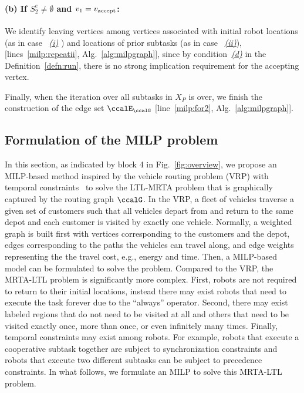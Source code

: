\documentclass[Afour,sageh,times]{sagej}
\newcommand{\vertex}[1]{v_{\textup{#1}}}
\begin{document}
\paragraph{(b) If $S_2^e \neq \emptyset$ and $v_1 = \vertex{accept}$:}\label{edge:vertex3} We identify leaving vertices among vertices associated with initial robot locations (as in case ~\hyperref[sec:a]{\it (i)} ) and locations of prior subtasks (as in case ~\hyperref[sec:a]{\it (ii)}), [lines~\ref{milp:repeatii},  Alg.~\ref{alg:milpgraph}], since by condition~\hyperref[cond:d]{\it (d)} in the Definition~\ref{defn:run}, there is no strong implication requirement for the accepting vertex.



Finally,  when the iteration over all subtasks in $X_{P}$ is over, we finish the construction of  the edge set $\ccalE_\ccalG$ [line~\ref{milp:for2},  Alg.~\ref{alg:milpgraph}].


 \subsection{Formulation of the MILP problem}\label{sec:milp}
 In this section, as indicated by block 4 in Fig.~\ref{fig:overview}, we propose an MILP-based method inspired by the vehicle routing problem (VRP) with temporal constraints~\cite{bredstrom2008combined} to solve the LTL-MRTA problem that is graphically captured by the routing graph $\ccalG$. In the VRP, a fleet of vehicles traverse a given set of customers such that all vehicles depart from and return to the same depot and each customer is visited by exactly one vehicle. Normally, a weighted graph is built first with vertices corresponding to the customers and the depot, edges corresponding to the paths the vehicles can travel along, and edge weights representing the the travel cost, e.g., energy and time. Then,  a MILP-based model can be formulated to solve the problem. Compared to the VRP, the MRTA-LTL problem is significantly more complex. First, robots are not required  to return to their initial locations, instead there may exist robots that need to execute the task forever due to the  ``always'' operator. Second, there may exist  labeled regions that do not need to be  visited at all and others that need to be visited exactly once,  more than once, or even infinitely  many times. Finally, temporal constraints may exist  among robots. For example, robots that execute a cooperative subtask together are subject to synchronization constraints and robots that execute two different subtasks can be subject to precedence constraints. In what follows, we formulate an MILP to solve this MRTA-LTL problem.
\end{document}
